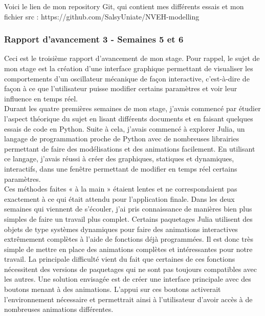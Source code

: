 \documentclass[a4paper, french, 12pt, titlepage]{article}
\begin{document}
Voici le lien de mon repository Git, qui contient mes différents essais et mon fichier src : https://github.com/SalsyUniate/NVEH-modelling 



\subsubsection*{Rapport d'avancement 3 - Semaines 5 et 6}

Ceci est le troisième rapport d’avancement de mon stage. Pour rappel, le sujet de mon stage est la création d’une interface graphique permettant de visualiser les comportements d’un oscillateur mécanique de façon interactive, c’est-à-dire de façon à ce que l’utilisateur puisse modifier certains paramètres et voir leur influence en temps réel. \\

Durant les quatre premières semaines de mon stage, j’avais commencé par étudier l’aspect théorique du sujet en lisant différents documents et en faisant quelques essais de code en Python. Suite à cela, j’avais commencé à explorer Julia, un langage de programmation proche de Python avec de nombreuses librairies permettant de faire des modélisations et des animations facilement. En utilisant ce langage, j’avais réussi à créer des graphiques, statiques et dynamiques, interactifs, dans une fenêtre permettant de modifier en temps réel certains paramètres. \\

Ces méthodes faites « à la main » étaient lentes et ne correspondaient pas exactement à ce qui était attendu pour l’application finale. Dans les deux semaines qui viennent de s’écouler, j’ai pris connaissance de manières bien plus simples de faire un travail plus complet. Certains paquetages Julia utilisent des objets de type systèmes dynamiques pour faire des animations interactives extrêmement complètes à l'aide de fonctions déjà programmées. Il est donc très simple de mettre en place des animations complètes et intéressantes pour notre travail. La principale difficulté vient du fait que certaines de ces fonctions nécessitent des versions de paquetages qui ne sont pas toujours compatibles avec les autres. Une solution envisagée est de créer une interface principale avec des boutons menant à des animations. L’appui sur ces boutons activerait l’environnement nécessaire et permettrait ainsi à l’utilisateur d’avoir accès à de nombreuses animations différentes. \\
\end{document}
